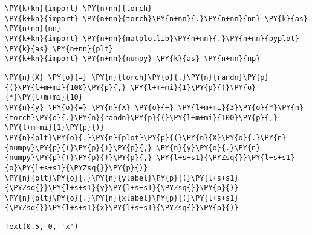     
    \begin{tcolorbox}[breakable, size=fbox, boxrule=1pt, pad at break*=1mm,colback=cellbackground, colframe=cellborder]
\begin{Verbatim}[commandchars=\\\{\}]
\PY{k+kn}{import} \PY{n+nn}{torch}
\PY{k+kn}{import} \PY{n+nn}{torch}\PY{n+nn}{.}\PY{n+nn}{nn} \PY{k}{as} \PY{n+nn}{nn}
\PY{k+kn}{import} \PY{n+nn}{matplotlib}\PY{n+nn}{.}\PY{n+nn}{pyplot} \PY{k}{as} \PY{n+nn}{plt}
\PY{k+kn}{import} \PY{n+nn}{numpy} \PY{k}{as} \PY{n+nn}{np}
\end{Verbatim}
\end{tcolorbox}

    \begin{tcolorbox}[breakable, size=fbox, boxrule=1pt, pad at break*=1mm,colback=cellbackground, colframe=cellborder]
\begin{Verbatim}[commandchars=\\\{\}]
\PY{n}{X} \PY{o}{=} \PY{n}{torch}\PY{o}{.}\PY{n}{randn}\PY{p}{(}\PY{l+m+mi}{100}\PY{p}{,} \PY{l+m+mi}{1}\PY{p}{)}\PY{o}{*}\PY{l+m+mi}{10}
\PY{n}{y} \PY{o}{=} \PY{n}{X} \PY{o}{+} \PY{l+m+mi}{3}\PY{o}{*}\PY{n}{torch}\PY{o}{.}\PY{n}{randn}\PY{p}{(}\PY{l+m+mi}{100}\PY{p}{,} \PY{l+m+mi}{1}\PY{p}{)}
\PY{n}{plt}\PY{o}{.}\PY{n}{plot}\PY{p}{(}\PY{n}{X}\PY{o}{.}\PY{n}{numpy}\PY{p}{(}\PY{p}{)}\PY{p}{,} \PY{n}{y}\PY{o}{.}\PY{n}{numpy}\PY{p}{(}\PY{p}{)}\PY{p}{,} \PY{l+s+s1}{\PYZsq{}}\PY{l+s+s1}{o}\PY{l+s+s1}{\PYZsq{}}\PY{p}{)}
\PY{n}{plt}\PY{o}{.}\PY{n}{ylabel}\PY{p}{(}\PY{l+s+s1}{\PYZsq{}}\PY{l+s+s1}{y}\PY{l+s+s1}{\PYZsq{}}\PY{p}{)}
\PY{n}{plt}\PY{o}{.}\PY{n}{xlabel}\PY{p}{(}\PY{l+s+s1}{\PYZsq{}}\PY{l+s+s1}{x}\PY{l+s+s1}{\PYZsq{}}\PY{p}{)}
\end{Verbatim}
\end{tcolorbox}

            \begin{tcolorbox}[breakable, size=fbox, boxrule=.5pt, pad at break*=1mm, opacityfill=0]
\begin{Verbatim}[commandchars=\\\{\}]
Text(0.5, 0, 'x')
\end{Verbatim}
\end{tcolorbox}
        
    \begin{center}
    \end{center}
    { \hspace*{\fill} \\}
    
